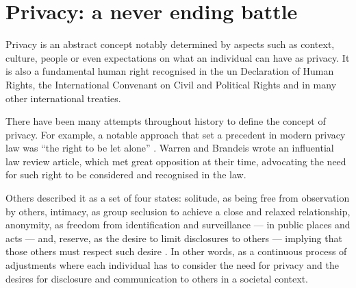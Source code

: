 


\section{Privacy: a never ending battle}
    \label{section:thesis:privacy-a-never-ending-battle}

Privacy is an abstract concept notably determined by aspects such as context, culture, 
people or even expectations on what an individual can have as privacy. It is also 
a fundamental human right recognised in the \ac{un} Declaration of Human Rights, 
the International Convenant on Civil and Political Rights and in many other international 
treaties.

There have been many attempts throughout history to define the concept of privacy. 
For example, a notable approach that set a precedent in modern privacy law was ``the 
right to be let alone'' \cite{WarrenB90}. Warren and Brandeis wrote an influential 
law review article, which met great opposition at their time, advocating the need 
for such right to be considered and recognised in the  law. 

Others described it as a set of four states: solitude, as being free from observation 
by others, intimacy, as group seclusion to achieve a close and relaxed relationship, 
anonymity, as freedom from identification and surveillance --- in public places 
and acts --- and, reserve, as the desire to limit disclosures to others --- implying 
that those others must respect such desire \cite{Westin70}. In other words, as a 
continuous process of adjustments where each individual has to consider the need 
for privacy and the desires for disclosure and communication to others in a societal 
context.

